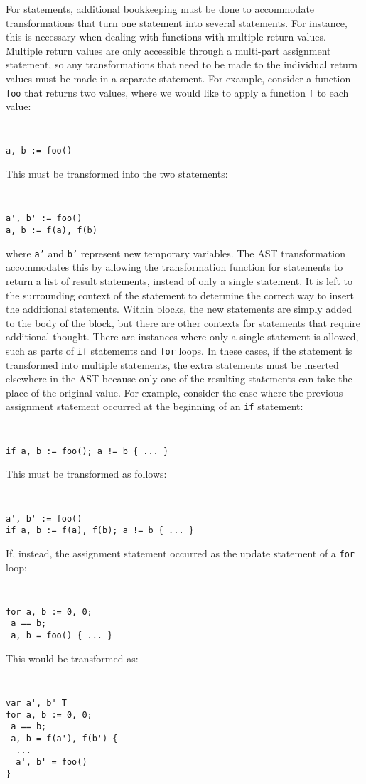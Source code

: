 \documentclass[letterpaper,11pt]{article}
\begin{document}
For statements, additional bookkeeping must be done to accommodate transformations that turn one statement into several statements. For instance, this is necessary when dealing with functions with multiple return values. Multiple return values are only accessible through a multi-part assignment statement, so any transformations that need to be made to the individual return values must be made in a separate statement. For example, consider a function \texttt{foo} that returns two values, where we would like to apply a function \texttt{f} to each value:
{ \tt \small
\begin{verbatim}
a, b := foo()
\end{verbatim}
}
This must be transformed into the two statements:
{ \tt \small
\begin{verbatim}
a', b' := foo()
a, b := f(a), f(b)
\end{verbatim}
}
where \texttt{a'} and \texttt{b'} represent new temporary variables. The AST transformation accommodates this by allowing the transformation function for statements to return a list of result statements, instead of only a single statement. It is left to the surrounding context of the statement to determine the correct way to insert the additional statements. Within blocks, the new statements are simply added to the body of the block, but there are other contexts for statements that require additional thought. There are instances where only a single statement is allowed, such as parts of \texttt{if} statements and \texttt{for} loops. In these cases, if the statement is transformed into multiple statements, the extra statements must be inserted elsewhere in the AST because only one of the resulting statements can take the place of the original value. For example, consider the case where the previous assignment statement occurred at the beginning of an \texttt{if} statement:
{ \tt \small
\begin{verbatim}
if a, b := foo(); a != b { ... }
\end{verbatim} 
}

This must be transformed as follows:
{ \tt \small
\begin{verbatim}
a', b' := foo()
if a, b := f(a), f(b); a != b { ... }
\end{verbatim}
}

If, instead, the assignment statement occurred as the update statement of a \texttt{for} loop:
{ \tt \small
\begin{verbatim}
for a, b := 0, 0;
 a == b;
 a, b = foo() { ... }
\end{verbatim} 
}
This would be transformed as:
{ \tt \small
\begin{verbatim}
var a', b' T
for a, b := 0, 0;
 a == b;
 a, b = f(a'), f(b') {
  ...
  a', b' = foo()
}
\end{verbatim} 
}
\end{document}
